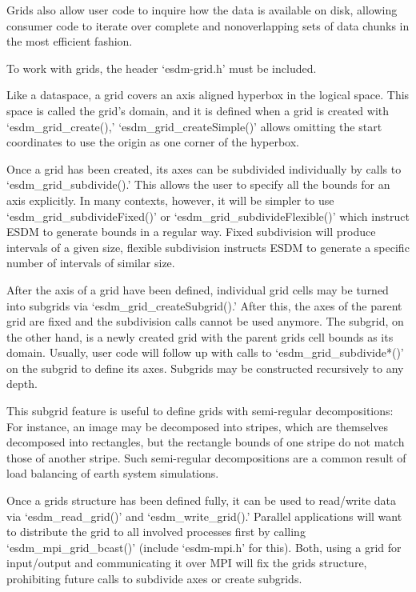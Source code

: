 Grids also allow user code to inquire how the data is available on disk,
allowing consumer code to iterate over complete and nonoverlapping sets
of data chunks in the most efficient fashion.

To work with grids, the header `esdm-grid.h' must be included.

Like a dataspace, a grid covers an axis aligned hyperbox in the logical
space. This space is called the grid's domain, and it is defined when a
grid is created with `esdm\_grid\_create(),'
`esdm\_grid\_createSimple()' allows omitting the start coordinates to
use the origin as one corner of the hyperbox.

Once a grid has been created, its axes can be subdivided individually by
calls to `esdm\_grid\_subdivide().' This allows the user to specify all
the bounds for an axis explicitly. In many contexts, however, it will be
simpler to use `esdm\_grid\_subdivideFixed()' or
`esdm\_grid\_subdivideFlexible()' which instruct ESDM to generate bounds
in a regular way. Fixed subdivision will produce intervals of a given
size, flexible subdivision instructs ESDM to generate a specific number
of intervals of similar size.

After the axis of a grid have been defined, individual grid cells may be
turned into subgrids via `esdm\_grid\_createSubgrid().' After this, the
axes of the parent grid are fixed and the subdivision calls cannot be
used anymore. The subgrid, on the other hand, is a newly created grid
with the parent grids cell bounds as its domain. Usually, user code will
follow up with calls to `esdm\_grid\_subdivide*()' on the subgrid to
define its axes. Subgrids may be constructed recursively to any depth.

This subgrid feature is useful to define grids with semi-regular
decompositions: For instance, an image may be decomposed into stripes,
which are themselves decomposed into rectangles, but the rectangle
bounds of one stripe do not match those of another stripe. Such
semi-regular decompositions are a common result of load balancing of
earth system simulations.

Once a grids structure has been defined fully, it can be used to
read/write data via `esdm\_read\_grid()' and `esdm\_write\_grid().'
Parallel applications will want to distribute the grid to all involved
processes first by calling `esdm\_mpi\_grid\_bcast()' (include
`esdm-mpi.h' for this). Both, using a grid for input/output and
communicating it over MPI will fix the grids structure, prohibiting
future calls to subdivide axes or create subgrids.

